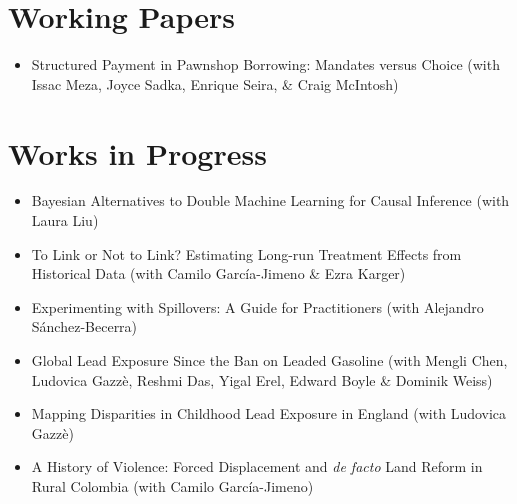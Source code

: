\documentclass[line,overlapped]{myres}
\begin{document}
\begin{resume}
\section{\sc Working Papers}
\begin{itemize}
  \item Structured Payment in Pawnshop Borrowing: Mandates versus Choice (with Issac Meza, Joyce Sadka, Enrique Seira, \& Craig McIntosh)
\end{itemize}


\section{\sc Works in Progress}
\begin{itemize}
  \item Bayesian Alternatives to Double Machine Learning for Causal Inference (with Laura Liu)
  \item To Link or Not to Link? Estimating Long-run Treatment Effects from Historical Data (with Camilo Garc\'{i}a-Jimeno \& Ezra Karger) 
  \item Experimenting with Spillovers: A Guide for Practitioners (with Alejandro S\'anchez-Becerra)
  \item Global Lead Exposure Since the Ban on Leaded Gasoline (with Mengli Chen, Ludovica Gazz\`e, Reshmi Das, Yigal Erel, Edward Boyle \& Dominik Weiss)
  \item Mapping Disparities in Childhood Lead Exposure in England (with Ludovica Gazz\`e) 
  \item A History of Violence: Forced Displacement and \emph{de facto} Land Reform in Rural Colombia (with Camilo Garc\'{i}a-Jimeno)
\end{itemize}


\end{resume}
\end{document}
